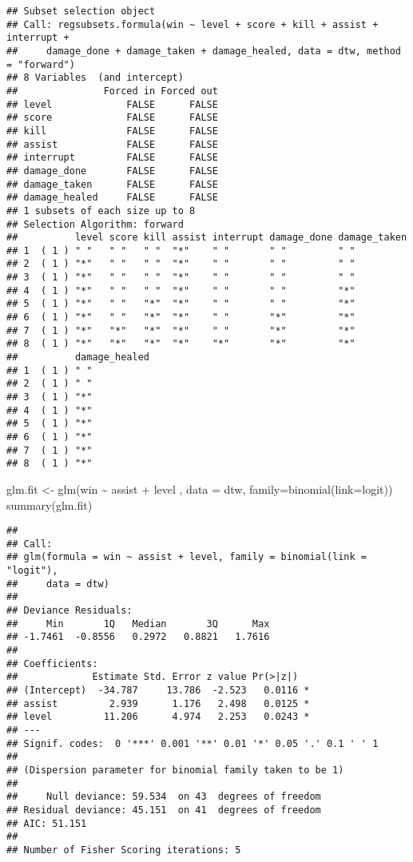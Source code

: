 \documentclass[
]{article}
\newenvironment{Shaded}{\begin{snugshade}}{\end{snugshade}}
\newcommand{\AttributeTok}[1]{\textcolor[rgb]{0.77,0.63,0.00}{#1}}
\newcommand{\FunctionTok}[1]{\textcolor[rgb]{0.00,0.00,0.00}{#1}}
\newcommand{\NormalTok}[1]{#1}
\newcommand{\OtherTok}[1]{\textcolor[rgb]{0.56,0.35,0.01}{#1}}
\newcommand{\SpecialCharTok}[1]{\textcolor[rgb]{0.00,0.00,0.00}{#1}}
\newcommand{\StringTok}[1]{\textcolor[rgb]{0.31,0.60,0.02}{#1}}
\begin{document}
\begin{verbatim}
## Subset selection object
## Call: regsubsets.formula(win ~ level + score + kill + assist + interrupt + 
##     damage_done + damage_taken + damage_healed, data = dtw, method = "forward")
## 8 Variables  (and intercept)
##               Forced in Forced out
## level             FALSE      FALSE
## score             FALSE      FALSE
## kill              FALSE      FALSE
## assist            FALSE      FALSE
## interrupt         FALSE      FALSE
## damage_done       FALSE      FALSE
## damage_taken      FALSE      FALSE
## damage_healed     FALSE      FALSE
## 1 subsets of each size up to 8
## Selection Algorithm: forward
##          level score kill assist interrupt damage_done damage_taken
## 1  ( 1 ) " "   " "   " "  "*"    " "       " "         " "         
## 2  ( 1 ) "*"   " "   " "  "*"    " "       " "         " "         
## 3  ( 1 ) "*"   " "   " "  "*"    " "       " "         " "         
## 4  ( 1 ) "*"   " "   " "  "*"    " "       " "         "*"         
## 5  ( 1 ) "*"   " "   "*"  "*"    " "       " "         "*"         
## 6  ( 1 ) "*"   " "   "*"  "*"    " "       "*"         "*"         
## 7  ( 1 ) "*"   "*"   "*"  "*"    " "       "*"         "*"         
## 8  ( 1 ) "*"   "*"   "*"  "*"    "*"       "*"         "*"         
##          damage_healed
## 1  ( 1 ) " "          
## 2  ( 1 ) " "          
## 3  ( 1 ) "*"          
## 4  ( 1 ) "*"          
## 5  ( 1 ) "*"          
## 6  ( 1 ) "*"          
## 7  ( 1 ) "*"          
## 8  ( 1 ) "*"
\end{verbatim}

\begin{Shaded}
\begin{Highlighting}[]
\NormalTok{glm.fit }\OtherTok{\textless{}{-}} \FunctionTok{glm}\NormalTok{(win }\SpecialCharTok{\textasciitilde{}}\NormalTok{ assist }\SpecialCharTok{+}\NormalTok{ level , }\AttributeTok{data =}\NormalTok{ dtw, }\AttributeTok{family=}\FunctionTok{binomial}\NormalTok{(}\AttributeTok{link=}\StringTok{\textquotesingle{}logit\textquotesingle{}}\NormalTok{))}
\FunctionTok{summary}\NormalTok{(glm.fit)}
\end{Highlighting}
\end{Shaded}

\begin{verbatim}
## 
## Call:
## glm(formula = win ~ assist + level, family = binomial(link = "logit"), 
##     data = dtw)
## 
## Deviance Residuals: 
##     Min       1Q   Median       3Q      Max  
## -1.7461  -0.8556   0.2972   0.8821   1.7616  
## 
## Coefficients:
##             Estimate Std. Error z value Pr(>|z|)  
## (Intercept)  -34.787     13.786  -2.523   0.0116 *
## assist         2.939      1.176   2.498   0.0125 *
## level         11.206      4.974   2.253   0.0243 *
## ---
## Signif. codes:  0 '***' 0.001 '**' 0.01 '*' 0.05 '.' 0.1 ' ' 1
## 
## (Dispersion parameter for binomial family taken to be 1)
## 
##     Null deviance: 59.534  on 43  degrees of freedom
## Residual deviance: 45.151  on 41  degrees of freedom
## AIC: 51.151
## 
## Number of Fisher Scoring iterations: 5
\end{verbatim}
\end{document}
